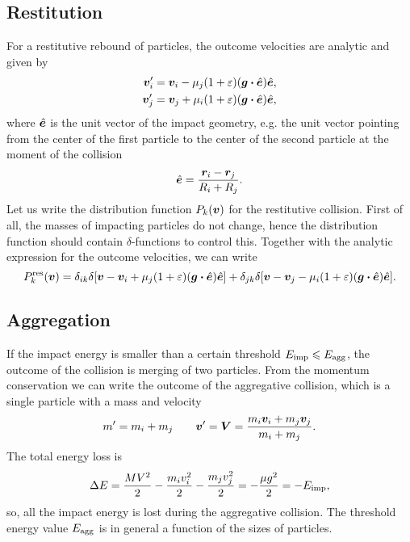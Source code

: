 \documentclass[aps,prl,preprint,groupedaddress,10pt]{revtex4-2}
\begin{document}
\subsection{Restitution}
For a restitutive rebound of particles, the outcome velocities are analytic and given by
\begin{equation}
    \begin{split}
        \bv_i'&=\bv_i-\mu_j\pqty{1+\eps}\pqty{\bg\vdot\be}\be,\\
        \bv_j'&=\bv_j+\mu_i\pqty{1+\eps}\pqty{\bg\vdot\be}\be,
    \end{split}
\end{equation}
where $\hat{\vb*{e}}$ is the unit vector of the impact geometry, e.g. the unit vector pointing 
from the center of the first particle to the center of the second particle at the moment
of the collision
\begin{equation}
    \hat{\vb*{e}}=\frac{\vb*{r}_i-\vb*{r}_j}{R_i+R_j}.
\end{equation}
Let us write the distribution function $P_k\pqty{\bv}$ for the restitutive collision.
First of all, the masses of impacting particles do not change, hence the distribution
function should contain $\delta$-functions to control this. Together with the analytic 
expression for the outcome velocities, we can write
\begin{equation}
    \utx{P_k}{res}\pqty{\bv}=
    \delta_{ik}\delta\bqty{\bv-\bv_i+\mu_j\pqty{1+\eps}\pqty{\bg\vdot\be}\be}+
    \delta_{jk}\delta\bqty{\bv-\bv_j-\mu_i\pqty{1+\eps}\pqty{\bg\vdot\be}\be}.
\end{equation}

\subsection{Aggregation}
If the impact energy is smaller than a certain threshold 
$E_{\mathrm{imp}}\leqslant E_{\mathrm{agg}}$, the outcome of the collision is merging of two 
particles. From the momentum conservation we can write the outcome of the aggregative 
collision, which is a single particle with a mass and velocity
\begin{equation}
    m'=m_i+m_j\qquad\vb*{v}'=\vb*{V}=\frac{m_i\vb*{v}_i+m_j\vb*{v}_j}{m_i+m_j}.
\end{equation}
The total energy loss is 
\begin{equation}    
        \Delta E=\frac{MV^2}{2}-\frac{m_iv_i^2}{2}-\frac{m_jv_j^2}{2}
        =-\frac{\mu g^2}{2}=-E_{\mathrm{imp}},
\end{equation}
so, all the impact energy is lost during the aggregative collision.
The threshold energy value $E_{\mathrm{agg}}$ is in general a function of the sizes of 
particles.
\end{document}
